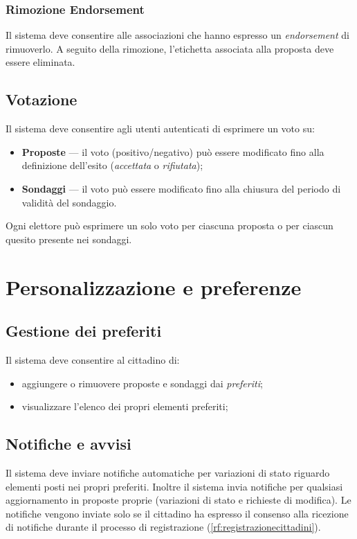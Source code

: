 \begin{rfscope}
\subsubsection{Rimozione Endorsement} \label{rf:rimozioneendoresement}
Il sistema deve consentire alle associazioni che hanno espresso un \emph{endorsement} di rimuoverlo.
A seguito della rimozione, l’etichetta associata alla proposta deve essere eliminata.

\subsection{Votazione} \label{rf:voto}
Il sistema deve consentire agli utenti autenticati di esprimere un voto su:

\begin{itemize}
    \item \textbf{Proposte} — il voto (positivo/negativo) può essere modificato fino alla definizione dell’esito (\emph{accettata} o \emph{rifiutata});
    \item \textbf{Sondaggi} — il voto può essere modificato fino alla chiusura del periodo di validità del sondaggio.
\end{itemize}

Ogni elettore può esprimere un solo voto per ciascuna proposta o per ciascun quesito presente nei sondaggi.

\section{Personalizzazione e preferenze} \label{rf:personalizzazioneepreferenze}

\subsection{Gestione dei preferiti} \label{rf:preferiti}
Il sistema deve consentire al cittadino di:
\begin{itemize}
	\item aggiungere o rimuovere proposte e sondaggi dai \emph{preferiti};
	\item visualizzare l’elenco dei propri elementi preferiti;
\end{itemize}

\subsection{Notifiche e avvisi} \label{rf:notifiche}
Il sistema deve inviare notifiche automatiche per variazioni di stato riguardo elementi posti nei propri preferiti.
Inoltre il sistema invia notifiche per qualsiasi aggiornamento in proposte proprie (variazioni di stato e richieste di modifica).
Le notifiche vengono inviate solo se il cittadino ha espresso il consenso alla ricezione di notifiche durante il processo di registrazione (\ref{rf:registrazionecittadini}).


\end{rfscope}
